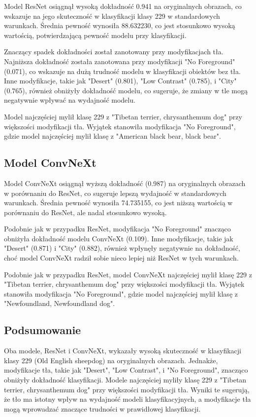 Model ResNet osiągnął wysoką dokładność 0.941 na oryginalnych obrazach, co wskazuje na jego skuteczność w klasyfikacji klasy 229 w standardowych warunkach. Średnia pewność wynosiła 88.632230, co jest stosunkowo wysoką wartością, potwierdzającą pewność modelu przy klasyfikacji.

Znaczący spadek dokładności został zanotowany przy modyfikacjach tła. Najniższa dokładność została zanotowana przy modyfikacji "No Foreground" (0.071), co wskazuje na dużą trudność modelu w klasyfikacji obiektów bez tła. Inne modyfikacje, takie jak "Desert" (0.801), "Low Contrast" (0.785), i "City" (0.765), również obniżyły dokładność modelu, co sugeruje, że zmiany w tle mogą negatywnie wpływać na wydajność modelu.

Model najczęściej mylił klasę 229 z "Tibetan terrier, chrysanthemum dog" przy większości modyfikacji tła. Wyjątek stanowiła modyfikacja "No Foreground", gdzie model najczęściej mylił klasę z "American black bear, black bear".

\subsection*{Model ConvNeXt}

Model ConvNeXt osiągnął wyższą dokładność (0.987) na oryginalnych obrazach w porównaniu do ResNet, co sugeruje lepszą wydajność w standardowych warunkach. Średnia pewność wynosiła 74.735155, co jest niższą wartością w porównaniu do ResNet, ale nadal stosunkowo wysoką.

Podobnie jak w przypadku ResNet, modyfikacja "No Foreground" znacząco obniżyła dokładność modelu ConvNeXt (0.109). Inne modyfikacje, takie jak "Desert" (0.871) i "City" (0.882), również wpłynęły negatywnie na dokładność, choć model ConvNeXt radził sobie nieco lepiej niż ResNet w tych warunkach.

Podobnie jak w przypadku ResNet, model ConvNeXt najczęściej mylił klasę 229 z "Tibetan terrier, chrysanthemum dog" przy większości modyfikacji tła. Wyjątek stanowiła modyfikacja "No Foreground", gdzie model najczęściej mylił klasę z "Newfoundland, Newfoundland dog".

\subsection*{Podsumowanie}

Oba modele, ResNet i ConvNeXt, wykazały wysoką skuteczność w klasyfikacji klasy 229 (Old English sheepdog) na oryginalnych obrazach. Jednakże, modyfikacje tła, takie jak "Desert", "Low Contrast", i "No Foreground", znacząco obniżyły dokładność klasyfikacji. Modele najczęściej myliły klasę 229 z "Tibetan terrier, chrysanthemum dog" przy większości modyfikacji tła. Wyniki te sugerują, że tło ma istotny wpływ na wydajność modeli klasyfikacyjnych, a modyfikacje tła mogą wprowadzać znaczące trudności w prawidłowej klasyfikacji.


